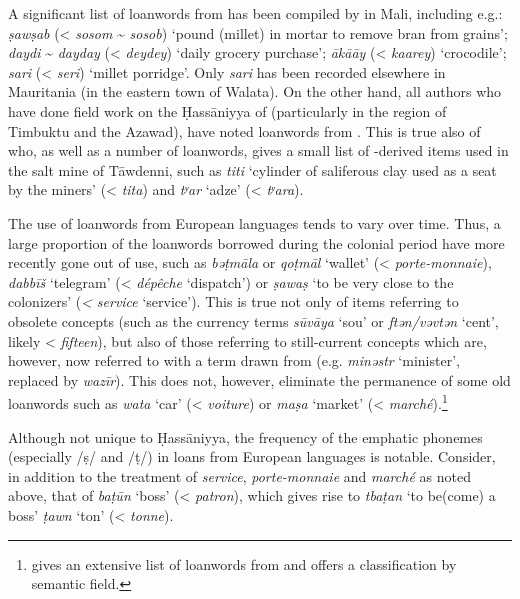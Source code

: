 \documentclass[output=paper]{langsci/langscibook}
\begin{document}
A significant list of {loanwords} from  has been compiled by \citet{Heath2004} in Mali, including e.g.: \textit{ṣawṣab} (< \textit{sosom} \~{} \textit{sosob}) ‘pound (millet) in mortar to remove bran from grains’; \textit{daydi} \~{} \textit{dayday} (< \textit{deydey}) ‘daily grocery purchase’; \textit{ākā{\R}āy} (< \textit{kaarey}) ‘crocodile’; \textit{sari} (< \textit{seri}) ‘millet porridge’. Only \textit{sari} has been recorded elsewhere in Mauritania (in the eastern town of Walata). On the other hand, all authors who have done field work on the Ḥassāniyya of  (particularly in the region of Timbuktu and the Azawad), have noted {loanwords} from . This is true also of \citet{Clauzel1960} who, as well as a number of  {loanwords}, gives a small list of -derived items used in the salt mine of Tāwdenni, such as \textit{titi} ‘cylinder of saliferous clay used as a seat by the miners’ (< \textit{tita}) and \textit{tʸar} ‘adze’ (< \textit{tʸara}).


The use of {loanwords} from European languages tends to vary over time. Thus, a large proportion of the  {loanwords} borrowed during the {colonial} period have more recently gone out of use, such as \textit{bə{\R}ṭmāla} or \textit{qo{\R}ṭmāl} ‘wallet’ (< \textit{porte-monnaie}), \textit{dabbīš} ‘telegram’ (< \textit{dépêche} ‘dispatch’) or \textit{ṣa{\R}waṣ} ‘to be very close to the colonizers’ (\textit{<} \textit{service} ‘service’). This is true not only of items referring to obsolete concepts (such as the currency terms \textit{sūvāya} ‘sou’ or \textit{ftən/vəvtən} ‘cent’, likely < \textit{fifteen}), but also of those referring to still-current concepts which are, however, now referred to with a term drawn from   (e.g. \textit{minəstr} ‘minister’, replaced by \textit{wazīr}). This does not, however, eliminate the permanence of some old {loanwords} such as \textit{wata} ‘car’ (< \textit{voiture}) or \textit{ma{\R}ṣa} ‘market’ (< \textit{marché}).\footnote{\citet{OuldMohamedBaba2003} gives an extensive list of {loanwords} from  and offers a classification by semantic field.}

Although not unique to Ḥassāniyya, the {frequency} of the {emphatic} phonemes (especially /ṣ/ and /ṭ/) in loans from European languages is notable. Consider, in addition to the treatment of \textit{service}, \textit{porte-monnaie} and \textit{marché} as noted above, that of \textit{baṭ{\R}ūn} ‘boss’ (< \textit{patron}), which gives rise to \textit{tbaṭ{\R}an} ‘to be(come) a boss’ \textit{ṭawn} ‘ton’ (< \textit{tonne}).
\end{document}

